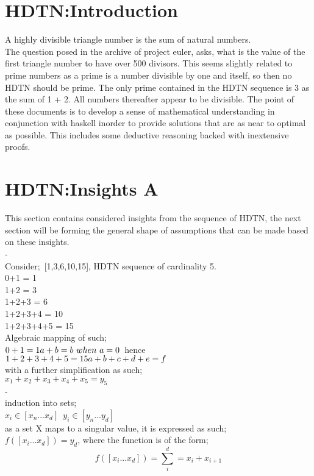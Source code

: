 \documentclass{article}
\begin{document}
\maketitle
\newpage
\section{HDTN:Introduction}
A highly divisible triangle number is the sum of natural numbers.\\
The question posed in the archive of project euler, asks, what is the value of the first triangle number to have over 500 divisors.
This seems slightly related to prime numbers as a prime is a number divisible by one and itself, so then no HDTN should be prime.
The only prime contained in the HDTN sequence is 3 as the sum of 1 + 2. All numbers thereafter appear to be divisible.
The point of these documents is to develop a sense of mathematical understanding in conjunction with haskell inorder to provide
solutions that are as near to optimal as possible. This includes some deductive reasoning backed with inextensive proofs. 

\section{HDTN:Insights A}
This section contains considered insights from the sequence of HDTN, the next section will be forming the general shape of
assumptions that can be made based on these insights.\\
{\color{white}-}\\
Consider;\ [1,3,6,10,15], HDTN sequence of cardinality 5.\\
0+1 = 1\\
1+2 = 3\\
1+2+3 = 6\\
1+2+3+4 = 10\\
1+2+3+4+5 = 15\\
Algebraic mapping of such;\\
$0+1=1\\a+b=b\ when\ a=0$\ hence\\ $1+2+3+4+5=15\\a+b+c+d+e=f$\\ with a further simplification as such;\\
$x_1+x_2+x_3+x_4+x_5=y_5$\\
{\color{white}-}\\
induction into sets;\\
$x_i\in[x_n...x_d]$\ $y_i\in[y_n...y_d]$\\ as a set X maps to a singular value, it is expressed as such;\\
$f([x_i...x_d])=y_d$, where the function is of the form;
\begin{equation}f([x_i...x_d])=\sum_i^d=x_i+x_{i+1}\end{equation}
\newpage
\end{document}
